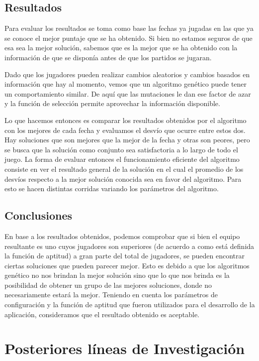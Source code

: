 \documentclass[pdftex,a4paper,10.5pt]{article}
\begin{document}
\subsection{Resultados} %
Para evaluar los resultados se toma como base las fechas ya jugadas en las que ya se conoce el mejor puntaje que se ha obtenido. Si bien no estamos seguros de que esa sea la mejor soluci\'on, sabemos que es la mejor que se ha obtenido con la informaci\'on de que se dispon\'ia antes de que los partidos se jugaran.

Dado que los jugadores pueden realizar cambios aleatorios y cambios basados en informaci\'on que hay al momento, vemos que un algoritmo gen\'etico puede tener un comportamiento similar. De aqu\'i que las mutaciones le dan ese factor de azar y la funci\'on de selecci\'on permite aprovechar la informaci\'on disponible.

Lo que hacemos entonces es comparar los resultados obtenidos por el algoritmo con los mejores de cada fecha y evaluamos el desv\'io que ocurre entre estos dos. Hay soluciones que son mejores que la mejor de la fecha y otras son peores, pero se busca que la soluci\'on como conjunto sea satisfactoria a lo largo de todo el juego.
La forma de evaluar entonces el funcionamiento eficiente del algoritmo consiste en ver el resultado general de la soluci\'on en el cual el promedio de los desv\'ios respecto a la mejor soluci\'on conocida sea en favor del algoritmo. Para esto se hacen distintas corridas variando los par\'ametros del algoritmo.

\subsection{Conclusiones} %
En base a los resultados obtenidos, podemos comprobar que si bien el equipo resultante es uno cuyos jugadores son superiores (de acuerdo a como está definida la función de aptitud) a gran parte del total de jugadores, se pueden encontrar ciertas soluciones que pueden parecer mejor. Esto es debido a que los algoritmos gen\'etico no nos brindan la mejor soluci\'on sino que lo que nos brinda es la posibilidad de obtener un grupo de las mejores soluciones, donde no necesariamente estar\'a la mejor. Teniendo en cuenta los par\'ametros de configuraci\'on y la funci\'on de aptitud que fueron utilizados para el desarrollo de la aplicaci\'on, consideramos que el resultado obtenido es aceptable.

	
\section{Posteriores l\'ineas de Investigaci\'on} %
\end{document}
